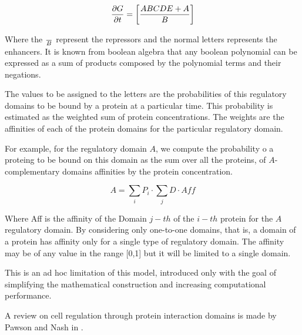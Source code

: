 \begin{equation}
\frac{\partial{G}}{\partial t} = \left[ ABCDE + A\over{B} \right]
\end{equation}

Where the $\over{B}$ represent the repressors and the normal letters represents
the enhancers. It is known from boolean algebra that any boolean polynomial can
be expressed as a sum of products composed by the polynomial terms and their
negations.

The values to be assigned to the letters are the probabilities of this
regulatory domains to be bound by a protein at a particular time. This probability
is estimated as the weighted sum of protein concentrations. The weights are the
affinities of each of the protein domains for the particular regulatory domain.

For example, for the regulatory domain $A$, we compute the probability o a
proteing to be bound on this domain as the sum over all the proteins, of
$A$-complementary domains affinities by the protein concentration.


\begin{equation}
A = \sum_i P_i \cdot \sum_j D  \cdot Aff
\end{equation}

Where Aff is the affinity of the Domain $j-th$ of the $i-th$ protein for the
$A$ regulatory domain. By considering only one-to-one domains, that is, a domain
of a protein has affinity only for a single type of regulatory domain. The affinity
may be of any value in the range [0,1] but it will be limited to a single domain.

This is an ad hoc limitation of this model, introduced only with the goal of simplifying
the mathematical construction and increasing computational performance.


A review on cell regulation through protein interaction domains is made by
Pawson and Nash in \cite{Pawson2003}.


